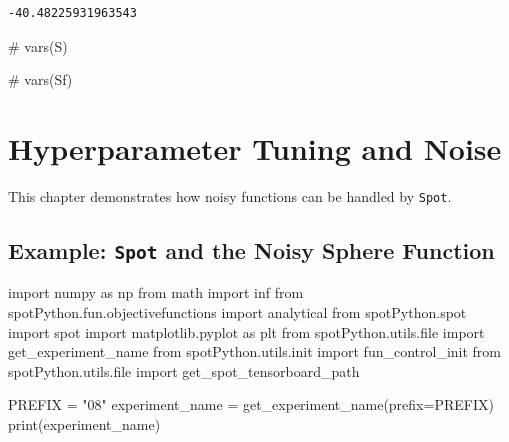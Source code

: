 \documentclass[
  letterpaper,
  DIV=11,
  numbers=noendperiod]{scrreprt}
\newenvironment{Shaded}{\begin{snugshade}}{\end{snugshade}}
\newcommand{\BuiltInTok}[1]{\textcolor[rgb]{0.00,0.23,0.31}{#1}}
\newcommand{\CommentTok}[1]{\textcolor[rgb]{0.37,0.37,0.37}{#1}}
\newcommand{\ImportTok}[1]{\textcolor[rgb]{0.00,0.46,0.62}{#1}}
\newcommand{\NormalTok}[1]{\textcolor[rgb]{0.00,0.23,0.31}{#1}}
\newcommand{\OperatorTok}[1]{\textcolor[rgb]{0.37,0.37,0.37}{#1}}
\newcommand{\StringTok}[1]{\textcolor[rgb]{0.13,0.47,0.30}{#1}}
\begin{document}
\begin{verbatim}
-40.48225931963543
\end{verbatim}

\begin{Shaded}
\begin{Highlighting}[]
\CommentTok{\# vars(S)}
\end{Highlighting}
\end{Shaded}

\begin{Shaded}
\begin{Highlighting}[]
\CommentTok{\# vars(Sf)}
\end{Highlighting}
\end{Shaded}

\hypertarget{sec-noise}{%
\chapter{Hyperparameter Tuning and Noise}\label{sec-noise}}

This chapter demonstrates how noisy functions can be handled by
\texttt{Spot}.

\hypertarget{example-spot-and-the-noisy-sphere-function}{%
\section{\texorpdfstring{Example: \texttt{Spot} and the Noisy Sphere
Function}{Example: Spot and the Noisy Sphere Function}}\label{example-spot-and-the-noisy-sphere-function}}

\begin{Shaded}
\begin{Highlighting}[]
\ImportTok{import}\NormalTok{ numpy }\ImportTok{as}\NormalTok{ np}
\ImportTok{from}\NormalTok{ math }\ImportTok{import}\NormalTok{ inf}
\ImportTok{from}\NormalTok{ spotPython.fun.objectivefunctions }\ImportTok{import}\NormalTok{ analytical}
\ImportTok{from}\NormalTok{ spotPython.spot }\ImportTok{import}\NormalTok{ spot}
\ImportTok{import}\NormalTok{ matplotlib.pyplot }\ImportTok{as}\NormalTok{ plt}
\ImportTok{from}\NormalTok{ spotPython.utils.}\BuiltInTok{file} \ImportTok{import}\NormalTok{ get\_experiment\_name}
\ImportTok{from}\NormalTok{ spotPython.utils.init }\ImportTok{import}\NormalTok{ fun\_control\_init}
\ImportTok{from}\NormalTok{ spotPython.utils.}\BuiltInTok{file} \ImportTok{import}\NormalTok{ get\_spot\_tensorboard\_path}

\NormalTok{PREFIX }\OperatorTok{=} \StringTok{"08"}
\NormalTok{experiment\_name }\OperatorTok{=}\NormalTok{ get\_experiment\_name(prefix}\OperatorTok{=}\NormalTok{PREFIX)}
\BuiltInTok{print}\NormalTok{(experiment\_name)}
\end{Highlighting}
\end{Shaded}
\end{document}
